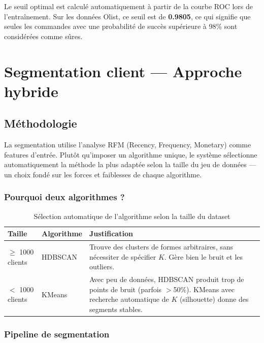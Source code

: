 \documentclass[12pt,a4paper]{report}
\begin{document}
Le seuil optimal est calcul\'{e} automatiquement \`{a} partir de la courbe ROC lors de l'entra\^{i}nement. Sur les donn\'{e}es Olist, ce seuil est de \textbf{0.9805}, ce qui signifie que seules les commandes avec une probabilit\'{e} de succ\`{e}s sup\'{e}rieure \`{a} 98\% sont consid\'{e}r\'{e}es comme s\^{u}res.


\section{Segmentation client — Approche hybride}

\subsection{M\'{e}thodologie}

La segmentation utilise l'analyse RFM (Recency, Frequency, Monetary) comme features d'entr\'{e}e. Plut\^{o}t qu'imposer un algorithme unique, le syst\`{e}me s\'{e}lectionne automatiquement la m\'{e}thode la plus adapt\'{e}e selon la taille du jeu de donn\'{e}es --- un choix fond\'{e} sur les forces et faiblesses de chaque algorithme.

\subsubsection{Pourquoi deux algorithmes ?}

\begin{table}[H]
\centering
\caption{S\'{e}lection automatique de l'algorithme selon la taille du dataset}
\label{tab:algo_selection}
\begin{tabularx}{\textwidth}{l l X}
\toprule
\textbf{Taille} & \textbf{Algorithme} & \textbf{Justification} \\
\midrule
$\geq$ 1000 clients & HDBSCAN & Trouve des clusters de formes arbitraires, sans n\'{e}cessiter de sp\'{e}cifier $K$. G\`{e}re bien le bruit et les outliers. \\
$<$ 1000 clients & KMeans & Avec peu de donn\'{e}es, HDBSCAN produit trop de points de bruit (parfois $>$50\%). KMeans avec recherche automatique de $K$ (silhouette) donne des segments stables. \\
\bottomrule
\end{tabularx}
\end{table}

\subsubsection{Pipeline de segmentation}
\end{document}
